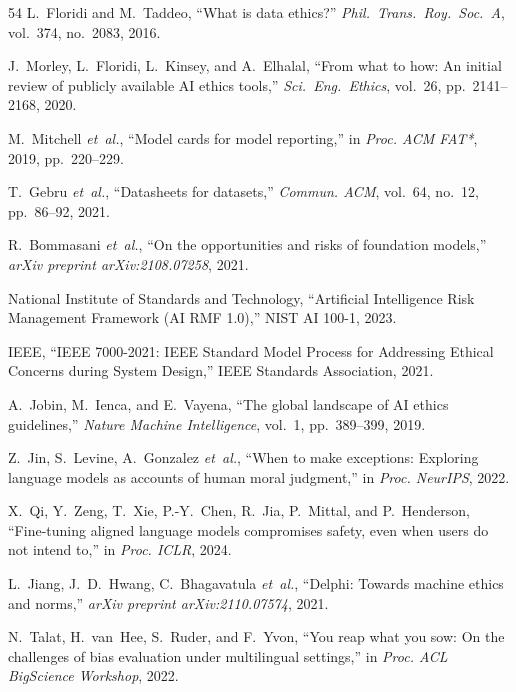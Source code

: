 \documentclass[conference]{IEEEtran}
\begin{document}
\begin{thebibliography}{54}
L.~Floridi and M.~Taddeo, ``What is data ethics?'' \emph{Phil.\ Trans.\ Roy.\ Soc.\ A}, vol.~374, no.~2083, 2016.

J.~Morley, L.~Floridi, L.~Kinsey, and A.~Elhalal, ``From what to how: An initial review of publicly available AI ethics tools,'' \emph{Sci.\ Eng.\ Ethics}, vol.~26, pp.~2141--2168, 2020.

M.~Mitchell \emph{et~al.}, ``Model cards for model reporting,'' in \emph{Proc. ACM FAT*}, 2019, pp.~220--229.

T.~Gebru \emph{et~al.}, ``Datasheets for datasets,'' \emph{Commun. ACM}, vol.~64, no.~12, pp.~86--92, 2021.

R.~Bommasani \emph{et~al.}, ``On the opportunities and risks of foundation models,'' \emph{arXiv preprint arXiv:2108.07258}, 2021.

National Institute of Standards and Technology, ``Artificial Intelligence Risk Management Framework (AI RMF 1.0),'' NIST AI 100-1, 2023.

IEEE, ``IEEE 7000-2021: IEEE Standard Model Process for Addressing Ethical Concerns during System Design,'' IEEE Standards Association, 2021.

A.~Jobin, M.~Ienca, and E.~Vayena, ``The global landscape of AI ethics guidelines,'' \emph{Nature Machine Intelligence}, vol.~1, pp.~389--399, 2019.

Z.~Jin, S.~Levine, A.~Gonzalez \emph{et~al.}, ``When to make exceptions: Exploring language models as accounts of human moral judgment,'' in \emph{Proc. NeurIPS}, 2022.

X.~Qi, Y.~Zeng, T.~Xie, P.-Y.~Chen, R.~Jia, P.~Mittal, and P.~Henderson, ``Fine-tuning aligned language models compromises safety, even when users do not intend to,'' in \emph{Proc. ICLR}, 2024.

L.~Jiang, J.~D.~Hwang, C.~Bhagavatula \emph{et~al.}, ``Delphi: Towards machine ethics and norms,'' \emph{arXiv preprint arXiv:2110.07574}, 2021.

N.~Talat, H.~van~Hee, S.~Ruder, and F.~Yvon, ``You reap what you sow: On the challenges of bias evaluation under multilingual settings,'' in \emph{Proc. ACL BigScience Workshop}, 2022.

\end{thebibliography}
\end{document}
